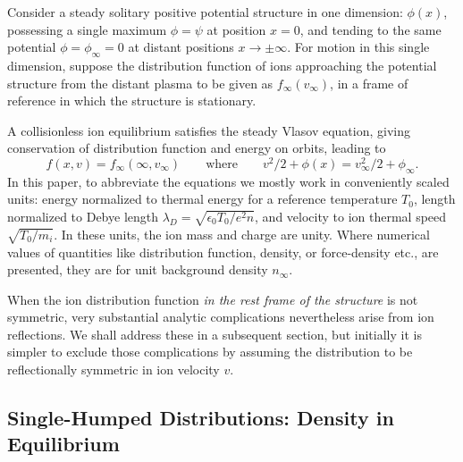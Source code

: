 \documentclass[pre]{revtex4-2}
\begin{document}
Consider a steady solitary positive potential structure in one
dimension: $\phi(x)$, possessing a single maximum $\phi=\psi$ at
position $x=0$, and tending to the same potential $\phi=\phi_\infty=0$
at distant positions $x\to \pm \infty$. For motion in this single
dimension, suppose the distribution function of ions approaching the
potential structure from the distant plasma to be given as
$f_\infty(v_\infty)$, in a frame of reference in which the structure
is stationary.

 A collisionless ion equilibrium
satisfies the steady Vlasov equation, giving conservation of
distribution function and energy on orbits, leading to
\begin{equation}
  f(x,v)=f_\infty(\infty,v_\infty) \qquad\mbox{where}\qquad 
  v^2/2+\phi(x) = v_\infty^2/2+\phi_\infty. 
\end{equation}
In this paper, to abbreviate the equations we mostly work in
conveniently scaled units: energy normalized to thermal energy for a
reference temperature $T_0$, length normalized to Debye length
$\lambda_D=\sqrt{\epsilon_0 T_0/e^2n}$, and velocity to ion thermal
speed $\sqrt{T_0/m_i}$. In these units, the ion mass and charge are
unity. Where numerical values of quantities like distribution
function, density, or force-density etc., are presented, they are for
unit background density $n_\infty$.

When the ion distribution function \emph{in the rest frame of the
  structure} is not symmetric, very substantial analytic complications
nevertheless arise from ion reflections. We shall address these in a
subsequent section, but initially it is simpler to exclude those
complications by assuming the distribution to be reflectionally
symmetric in ion velocity $v$.

\subsection{Single-Humped Distributions: Density in Equilibrium}
\end{document}
